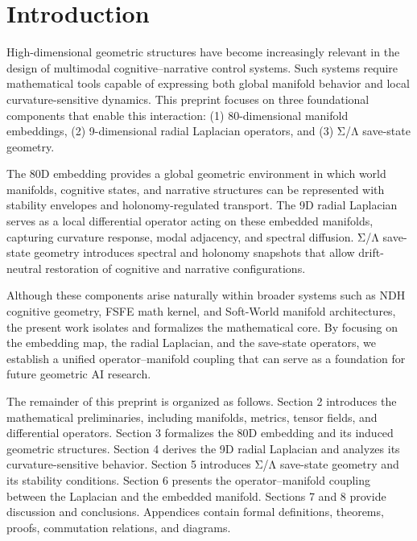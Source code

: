 \section{Introduction}

High-dimensional geometric structures have become increasingly relevant in the design of multimodal cognitive–narrative control systems. Such systems require mathematical tools capable of expressing both global manifold behavior and local curvature-sensitive dynamics. This preprint focuses on three foundational components that enable this interaction: (1) 80-dimensional manifold embeddings, (2) 9-dimensional radial Laplacian operators, and (3) Σ/Λ save-state geometry.

The 80D embedding provides a global geometric environment in which world manifolds, cognitive states, and narrative structures can be represented with stability envelopes and holonomy-regulated transport. The 9D radial Laplacian serves as a local differential operator acting on these embedded manifolds, capturing curvature response, modal adjacency, and spectral diffusion. Σ/Λ save-state geometry introduces spectral and holonomy snapshots that allow drift-neutral restoration of cognitive and narrative configurations.

Although these components arise naturally within broader systems such as NDH cognitive geometry, FSFE math kernel, and Soft-World manifold architectures, the present work isolates and formalizes the mathematical core. By focusing on the embedding map, the radial Laplacian, and the save-state operators, we establish a unified operator–manifold coupling that can serve as a foundation for future geometric AI research.

The remainder of this preprint is organized as follows. Section 2 introduces the mathematical preliminaries, including manifolds, metrics, tensor fields, and differential operators. Section 3 formalizes the 80D embedding and its induced geometric structures. Section 4 derives the 9D radial Laplacian and analyzes its curvature-sensitive behavior. Section 5 introduces Σ/Λ save-state geometry and its stability conditions. Section 6 presents the operator–manifold coupling between the Laplacian and the embedded manifold. Sections 7 and 8 provide discussion and conclusions. Appendices contain formal definitions, theorems, proofs, commutation relations, and diagrams.
